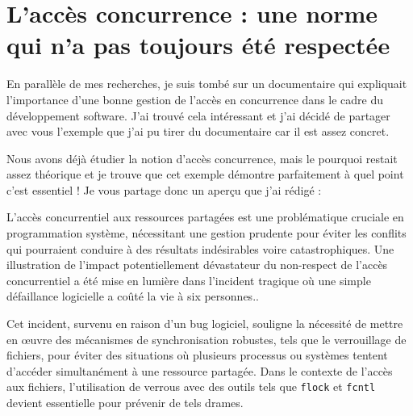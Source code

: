 \newpage
\section{L'accès concurrence : une norme qui n'a pas toujours été respectée}

En parallèle de mes recherches, je suis tombé sur un documentaire qui expliquait l'importance d'une bonne gestion de l'accès en concurrence dans le cadre du développement software. J'ai trouvé cela intéressant et j'ai décidé de partager avec vous l'exemple que j'ai pu tirer du documentaire car il est assez concret. 
\newline

Nous avons déjà étudier la notion d'accès concurrence, mais le pourquoi restait assez théorique et je trouve que cet exemple démontre parfaitement à quel point c'est essentiel ! Je vous partage donc un aperçu que j'ai rédigé :
\newline

L'accès concurrentiel aux ressources partagées est une problématique cruciale en programmation système, nécessitant une gestion prudente pour éviter les conflits qui pourraient conduire à des résultats indésirables voire catastrophiques. Une illustration de l'impact potentiellement dévastateur du non-respect de l'accès concurrentiel a été mise en lumière dans l'incident tragique où une simple défaillance logicielle a coûté la vie à six personnes.\cite{SoftwareBugVideo}.
\newline

Cet incident, survenu en raison d'un bug logiciel, souligne la nécessité de mettre en œuvre des mécanismes de synchronisation robustes, tels que le verrouillage de fichiers, pour éviter des situations où plusieurs processus ou systèmes tentent d'accéder simultanément à une ressource partagée. Dans le contexte de l'accès aux fichiers, l'utilisation de verrous avec des outils tels que \texttt{flock} et \texttt{fcntl} devient essentielle pour prévenir de tels drames\cite{UnderscoreVideo}.